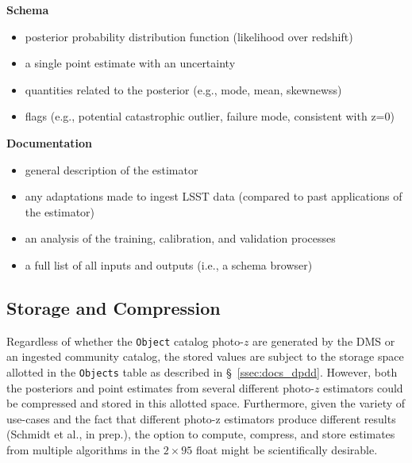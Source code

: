 \documentclass[DM,lsstdraft,toc]{lsstdoc}
\begin{document}
{\bf Schema}\\
\vspace{-15pt}
\begin{itemize}
\item posterior probability distribution function (likelihood over redshift)
\item a single point estimate with an uncertainty
\item quantities related to the posterior (e.g., mode, mean, skewnewss)
\item flags (e.g., potential catastrophic outlier, failure mode, consistent with z=0)
\end{itemize}

{\bf Documentation}\\
\vspace{-15pt}
\begin{itemize}
\item general description of the estimator
\item any adaptations made to ingest LSST data (compared to past applications of the estimator)
\item an analysis of the training, calibration, and validation processes
\item a full list of all inputs and outputs (i.e., a schema browser)
\end{itemize}

\subsection{Storage and Compression}\label{ssec:dp_store}

Regardless of whether the {\tt Object} catalog photo-$z$ are generated by the DMS or an ingested community catalog, the stored values are subject to the storage space allotted in the {\tt Objects} table as described in \S~\ref{ssec:docs_dpdd}.
However, both the posteriors and point estimates from several different photo-$z$ estimators could be compressed and stored in this allotted space.
Furthermore, given the variety of use-cases and the fact that different photo-z estimators produce different results (Schmidt et al., in prep.), the option to compute, compress, and store estimates from multiple algorithms in the $2\times95$ float might be scientifically desirable.
\end{document}
